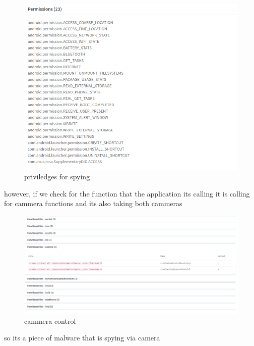 \documentclass[10pt,a4paper]{article} %
\begin{document}
        \begin{figure}[h!]
            \centering
            \includegraphics[width=0.8\linewidth]{SPY.png}
            \caption{priviledges for spying}
            \label{jajajaj}
        \end{figure}
        however, if we check for the function that the application its calling
        it is calling for cammera functions and its also taking both cammeras
        \begin{figure}[h!]
            \centering
            \includegraphics[width=0.8\linewidth]{camera.png}
            \caption{cammera control}
            \label{cam}
        \end{figure}
        so its a piece of malware that is spying via camera
























    \nocite{*}
    
    
\end{document}
